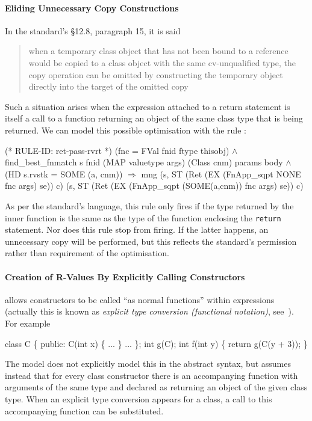\documentclass[11pt]{article}
\begin{document}
\paragraph{Eliding Unnecessary Copy Constructions} In the standard's
\S12.8, paragraph 15, it is said
\begin{quote}when a temporary class
  object that has not been bound to a reference would be copied to a
  class object with the same cv-unqualified type, the copy operation
  can be omitted by constructing the temporary object directly into
  the target of the omitted copy
\end{quote}
Such a situation arises when the expression attached to a return
statement is itself a call to a function returning an object of the
same class type that is being returned.  We can model this possible
optimisation with the rule :%
\begin{stdrule}
(* RULE-ID: ret-pass-rvrt *)
     (fnc = FVal fnid ftype thisobj) \(\land\)
     find_best_fnmatch s fnid (MAP valuetype args)
                       (Class cnm) params body \(\land\)
     (HD s.rvstk = SOME (a, cnm))
   \(\Rightarrow\)
     mng (s, ST (Ret (EX (FnApp_sqpt NONE fnc args) se)) c)
         (s, ST (Ret (EX (FnApp_sqpt (SOME(a,cnm)) fnc args)
                         se))
                c)
\end{stdrule}
As per the standard's language, this rule only fires if the type
returned by the inner function is the same as the type of the function
enclosing the \texttt{return} statement.  Nor does this rule stop
 from firing.  If the latter happens, an
unnecessary copy will be performed, but this reflects the standard's
permission rather than requirement of the optimisation.

\paragraph{Creation of R-Values By Explicitly Calling Constructors}
%
\cpp{} allows constructors to be called ``as normal functions'' within
expressions (actually this is known as \emph{explicit type conversion
  (functional notation)}, see~\cite[\S5.2.3]{cpp-standard-iso14882}).
For example
\begin{stdrule}
   class C \{
   public:
     C(int x) \{ ... \}
     ...
   \};
   int g(C);
   int f(int y)
   \{
      return g(C(y + 3));
   \}
\end{stdrule}
The model does not explicitly model this in the abstract syntax, but
assumes instead that for every class constructor there is an
accompanying function with arguments of the same type and declared as
returning an object of the given class type.  When an explicit type
conversion appears for a class, a call to this accompanying function
can be substituted.
\end{document}
